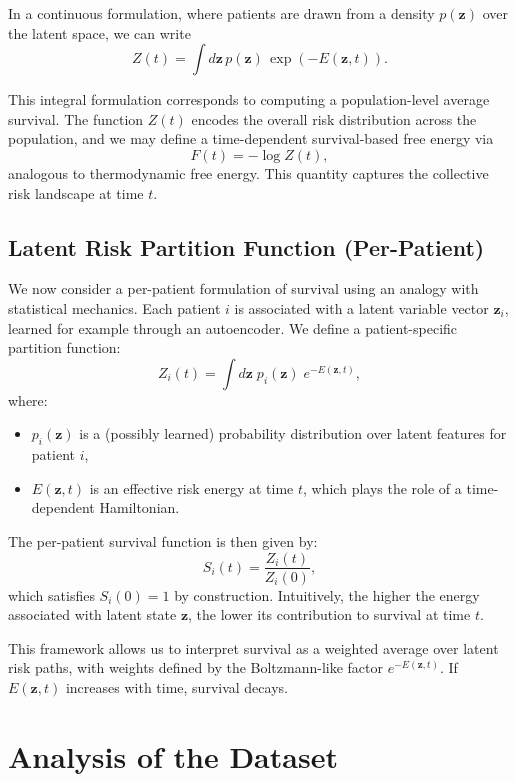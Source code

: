\documentclass[12pt]{article}
\begin{document}
In a continuous formulation, where patients are drawn from a density $p(\mathbf{z})$ over the latent space, we can write
$$
Z(t) = \int d\mathbf{z} \, p(\mathbf{z}) \, \exp\left(-E(\mathbf{z}, t)\right).
$$

This integral formulation corresponds to computing a population-level average survival. The function $Z(t)$ encodes the overall risk distribution across the population, and we may define a time-dependent survival-based free energy via
$$
F(t) = -\log Z(t),
$$
analogous to thermodynamic free energy. This quantity captures the collective risk landscape at time $t$.

\subsection{Latent Risk Partition Function (Per-Patient)}

We now consider a per-patient formulation of survival using an analogy with statistical mechanics. Each patient $ i $ is associated with a latent variable vector $ \mathbf{z}_i $, learned for example through an autoencoder.
We define a patient-specific partition function:
\begin{equation}
Z_i(t) = \int d\mathbf{z} \; p_i(\mathbf{z}) \; e^{-E(\mathbf{z}, t)},
\end{equation}
where:
\begin{itemize}
    \item $ p_i(\mathbf{z}) $ is a (possibly learned) probability distribution over latent features for patient $ i $,
    \item $ E(\mathbf{z}, t) $ is an effective risk energy at time $ t $, which plays the role of a time-dependent Hamiltonian.
\end{itemize}

The per-patient survival function is then given by:
\begin{equation}
S_i(t) = \frac{Z_i(t)}{Z_i(0)},
\end{equation}
which satisfies $ S_i(0) = 1 $ by construction. Intuitively, the higher the energy associated with latent state $ \mathbf{z} $, the lower its contribution to survival at time $ t $.

This framework allows us to interpret survival as a weighted average over latent risk paths, with weights defined by the Boltzmann-like factor $ e^{-E(\mathbf{z}, t)} $. If $ E(\mathbf{z}, t) $ increases with time, survival decays.

\clearpage
\section{Analysis of the Dataset}
\end{document}
